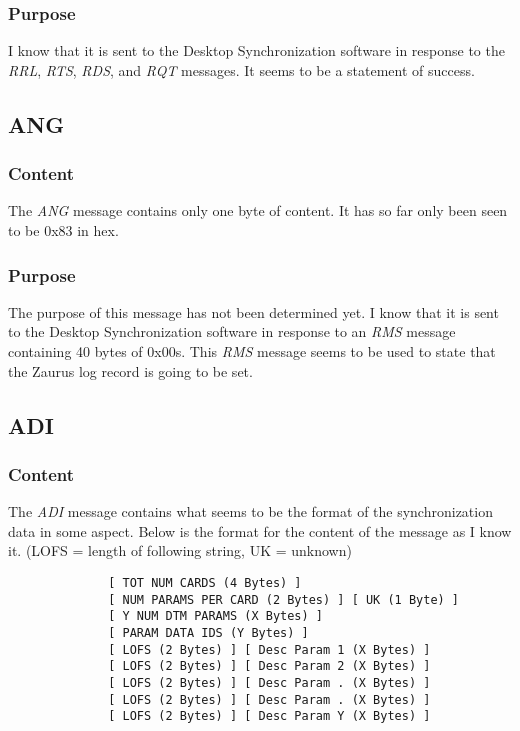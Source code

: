             \subsubsection{Purpose}

            I know that it is sent to the Desktop Synchronization software in
            response to the \emph{RRL}, \emph{RTS}, \emph{RDS}, and \emph{RQT}
            messages. It seems to be a statement of success.

        \subsection{ANG}

            \subsubsection{Content}

            The \emph{ANG} message contains only one byte of content. It has
            so far only been seen to be 0x83 in hex.

            \subsubsection{Purpose}

            The purpose of this message has not been determined yet. I know
            that it is sent to the Desktop Synchronization software in
            response to an \emph{RMS} message containing 40 bytes of
            0x00s. This \emph{RMS} message seems to be used to state that the
            Zaurus log record is going to be set.

        \subsection{ADI}

            \subsubsection{Content}

            The \emph{ADI} message contains what seems to be the format of the
            synchronization data in some aspect. Below is the format for the
            content of the message as I know it. (LOFS = length of following
            string, UK = unknown)

            \begin{verbatim}
              [ TOT NUM CARDS (4 Bytes) ]
              [ NUM PARAMS PER CARD (2 Bytes) ] [ UK (1 Byte) ]
              [ Y NUM DTM PARAMS (X Bytes) ]
              [ PARAM DATA IDS (Y Bytes) ]
              [ LOFS (2 Bytes) ] [ Desc Param 1 (X Bytes) ]
              [ LOFS (2 Bytes) ] [ Desc Param 2 (X Bytes) ]
              [ LOFS (2 Bytes) ] [ Desc Param . (X Bytes) ]
              [ LOFS (2 Bytes) ] [ Desc Param . (X Bytes) ]
              [ LOFS (2 Bytes) ] [ Desc Param Y (X Bytes) ]
            \end{verbatim}

